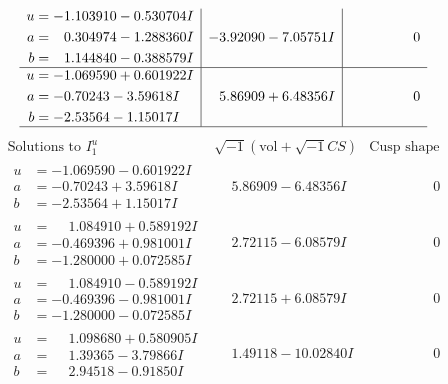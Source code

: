 \documentclass[1p]{elsarticle_modified}
\theoremstyle{definition}
\newcommand{\I}{\sqrt{-1}}
\begin{document}
$$\begin{array}{c|c|c}
\begin{aligned}
u &= -1.103910 - 0.530704 I \\
a &= \phantom{-}0.304974 - 1.288360 I \\
b &= \phantom{-}1.144840 - 0.388579 I\end{aligned}
 & -3.92090 - 7.05751 I & \phantom{-0.000000 } 0 \\ \hline\begin{aligned}
u &= -1.069590 + 0.601922 I \\
a &= -0.70243 - 3.59618 I \\
b &= -2.53564 - 1.15017 I\end{aligned}
 & \phantom{-}5.86909 + 6.48356 I & \phantom{-0.000000 } 0\\
 \hline 
 \end{array}$$\newpage$$\begin{array}{c|c|c}  
\text{Solutions to }I^u_{1}& \I (\text{vol} + \sqrt{-1}CS) & \text{Cusp shape}\\
 \hline 
\begin{aligned}
u &= -1.069590 - 0.601922 I \\
a &= -0.70243 + 3.59618 I \\
b &= -2.53564 + 1.15017 I\end{aligned}
 & \phantom{-}5.86909 - 6.48356 I & \phantom{-0.000000 } 0 \\ \hline\begin{aligned}
u &= \phantom{-}1.084910 + 0.589192 I \\
a &= -0.469396 + 0.981001 I \\
b &= -1.280000 + 0.072585 I\end{aligned}
 & \phantom{-}2.72115 - 6.08579 I & \phantom{-0.000000 } 0 \\ \hline\begin{aligned}
u &= \phantom{-}1.084910 - 0.589192 I \\
a &= -0.469396 - 0.981001 I \\
b &= -1.280000 - 0.072585 I\end{aligned}
 & \phantom{-}2.72115 + 6.08579 I & \phantom{-0.000000 } 0 \\ \hline\begin{aligned}
u &= \phantom{-}1.098680 + 0.580905 I \\
a &= \phantom{-}1.39365 - 3.79866 I \\
b &= \phantom{-}2.94518 - 0.91850 I\end{aligned}
 & \phantom{-}1.49118 - 10.02840 I & \phantom{-0.000000 } 0 \\ \hline\begin{aligned}

\end{aligned}
\end{array}$$
\end{document}
